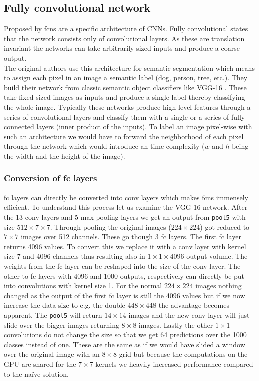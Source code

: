 \subsection{Fully convolutional network} %
\label{sub:conepts:fcn:fcn}
Proposed by \citet{long_fully_2015} \glspl{fcn} are a specific architecture of CNNs. Fully convolutional states that the network consists only of convolutional layers. As these are translation invariant the networks can take arbitrarily sized inputs and produce a coarse output.\\
The original authors use this architecture for semantic segmentation which means to assign each pixel in an image a semantic label (dog, person, tree, etc.). They build their network from classic semantic object classifiers like VGG-16 \citep{simonyan_very_2014}. These take fixed sized images as inputs and produce a single label thereby classifying the whole image. Typically these networks produce high level features through a series of convolutional layers and classify them with a single or a series of fully connected layers (inner product of the inputs). To label an image pixel-wise with such an architecture we would have to forward the neighborhood of each pixel through the network which would introduce an  time complexity ($w$ and $h$ being the width and the height of the image).

\subsubsection{Conversion of \gls{fc} layers}
\gls{fc} layers can directly be converted into \gls{conv} layers which makes \glspl{fcn} immensely efficient. To understand this process let us examine the VGG-16 network. After the 13 \gls{conv} layers and 5 max-pooling layers we get an output from \texttt{pool5} with size $512\times7\times7$. Through pooling the original images ($224\times224$) got reduced to $7\times7$ images over 512 channels. These go though 3 \gls{fc} layers. The first \gls{fc} layer returns 4096 values. To convert this we replace it with a \gls{conv} layer with kernel size 7 and 4096 channels thus resulting also in $1\times1\times4096$ output volume. The weights from the \gls{fc} layer can be reshaped into the size of the \gls{conv} layer. The other to \gls{fc} layers with 4096 and 1000 outputs, respectively can directly be put into convolutions with kernel size 1.
For the normal $224\times224$ images nothing changed as the output of the first \gls{fc} layer is still the 4096 values but if we now increase the data size to e.g. the double $448\times448$ the advantage becomes apparent. The \texttt{pool5} will return $14\times14$ images and the new \gls{conv} layer will just slide over the bigger images returning $8\times8$ images. Lastly the other $1\times1$ convolutions do not change the size so that we get 64 predictions over the 1000 classes instead of one. These are the same as if we would have slided a window over the original image with an $8\times8$ grid but because the computations on the GPU are shared for the $7\times7$ kernels we heavily increased performance compared to the naïve solution.

